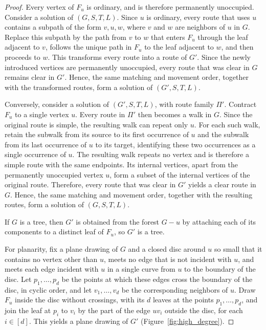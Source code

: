 \documentclass[a4paper,USenglish,thm-restate]{lipics-v2021}
\theoremstyle{problemstyle}
\begin{document}
\begin{proof}
Every vertex of $F_u$ is ordinary, and is therefore permanently unoccupied.
Consider a solution of $(G,S,T,L)$. Since $u$ is ordinary, every route
that uses $u$ contains a subpath of the form $v,u,w$, where $v$ and $w$ are
neighbors of $u$ in $G$. Replace this subpath by the path from $v$ to $w$ that
enters $F_u$ through the leaf adjacent to $v$, follows the unique path in $F_u$
to the leaf adjacent to $w$, and then proceeds to $w$. This transforms
every route into a
route of $G'$. Since the newly introduced vertices are permanently unoccupied,
every route that was clear in $G$ remains clear in $G'$. Hence, the same
matching and movement order, together with the transformed routes, form a
solution of $(G',S,T,L)$.

Conversely, consider a solution of $(G',S,T,L)$, with route family $\Pi'$. Contract
$F_u$ to a single vertex $u$. Every route in $\Pi'$ then becomes a walk in
$G$. Since the original route is simple, the resulting walk can repeat only
$u$. For each such walk, retain the subwalk from its source to its first
occurrence of $u$ and the subwalk from its last occurrence of $u$ to its
target, identifying these two occurrences as a single occurrence of $u$.
The resulting walk repeats no vertex and is therefore a simple route with
the same endpoints. Its
internal vertices, apart from the permanently unoccupied vertex $u$, form a
subset of the internal vertices of the original route. Therefore, every route
that was clear in $G'$ yields a clear route in $G$. Hence, the same matching and
movement order, together with the resulting routes, form a solution of
$(G,S,T,L)$.

If $G$ is a tree, then $G'$ is obtained from the forest $G-u$ by attaching
each of its components to a distinct leaf of $F_u$, so $G'$ is
a tree.

For planarity, fix a plane drawing of $G$ and a closed disc around $u$ so
small that it contains no vertex other than $u$, meets no edge that is not
incident with $u$, and meets each edge incident with $u$ in a single curve from
$u$ to the boundary of the disc. Let $p_1,\ldots,p_d$ be the points at which
these edges cross the boundary of the disc, in cyclic order, and let
$v_1,\ldots,v_d$ be the corresponding neighbors of $u$. Draw $F_u$ inside the
disc without crossings, with its $d$ leaves at the points $p_1,\ldots,p_d$, and
join the leaf at $p_i$ to $v_i$ by the part of the edge $uv_i$ outside the disc,
for each $i\in[d]$. This yields a plane drawing of $G'$
(Figure~\ref{fig:high_degree}).
\end{proof}
\end{document}
